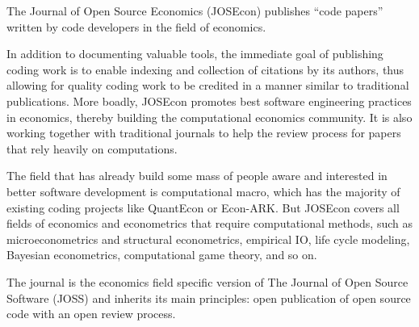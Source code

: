 
The Journal of Open Source Economics (JOSEcon) publishes ``code papers'' written by 
code developers in the field of economics. 

In addition to documenting valuable tools, the immediate goal of publishing
coding work is to enable indexing and collection of citations by its authors,
thus allowing for quality coding work to be credited in a manner similar to
traditional publications.  More boadly, JOSEcon promotes best software
engineering practices in economics, thereby building the computational
economics community.  It is also working together with traditional journals to
help the review process for papers that rely heavily on computations.  

The field that has already build some mass of people aware and interested in
better software development is computational macro, which has the majority of
existing coding projects like QuantEcon or Econ-ARK.  But JOSEcon covers all
fields of economics and econometrics that require computational methods, such
as microeconometrics and structural econometrics, empirical IO, life cycle
modeling, Bayesian econometrics, computational game theory, and so on. 

The journal is the economics field specific version of The Journal of Open
Source Software (JOSS) and inherits its main principles: open publication of
open source code with an open review process.

